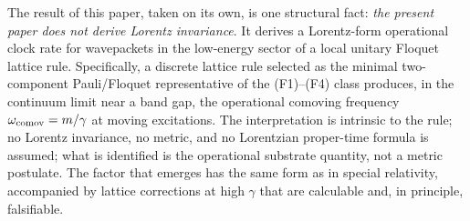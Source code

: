 \documentclass[11pt,a4paper]{article}
\begin{document}
The result of this paper, taken on its own, is one structural
fact: \emph{the present paper does not derive Lorentz
invariance}. It derives a Lorentz-form operational clock rate
for wavepackets in the low-energy sector of a local unitary
Floquet lattice rule. Specifically, a discrete lattice rule
selected as the minimal two-component Pauli/Floquet
representative of the (F1)--(F4) class produces, in the
continuum limit near a band gap, the operational comoving
frequency $\omega_{\rm comov} = m/\gamma$ at moving
excitations. The interpretation is intrinsic to the rule; no
Lorentz invariance, no metric, and no Lorentzian proper-time
formula is assumed; what is identified is the operational
substrate quantity, not a metric postulate. The factor that
emerges has the same form as in special relativity, accompanied
by lattice corrections at high $\gamma$ that are calculable
and, in principle, falsifiable.



\end{document}
